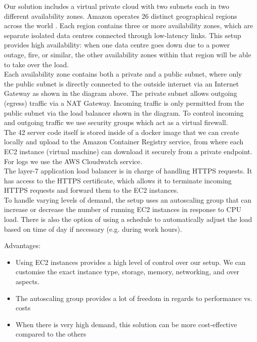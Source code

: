 Our solution includes a virtual private cloud with two subnets each in two different availability zones. Amazon operates 26 distinct geographical regions across the world \cite{amazon-2022D}. Each region contains three or more availability zones, which are separate isolated data centres connected through low-latency links. This setup provides high availability: when one data centre goes down due to a power outage, fire, or similar, the other availability zones within that region will be able to take over the load.
\\[12pt]
Each availability zone contains both a private and a public subnet, where only the public subnet is directly connected to the outside internet via an Internet Gateway as shown in the diagram above. The private subnet allows outgoing (egress) traffic via a NAT Gateway. Incoming traffic is only permitted from the public subnet via the load balancer shown in the diagram. To control incoming and outgoing traffic we use security groups which act as a virtual firewall.
\\[12pt]
The 42 server code itself is stored inside of a docker image that we can create locally and upload to the Amazon Container Registry service, from where each EC2 instance (virtual machine) can download it securely from a private endpoint. For logs we use the AWS Cloudwatch service.
\\[12pt]
The layer-7 application load balancer is in charge of handling HTTPS requests. It has access to the HTTPS certificate, which allows it to terminate incoming HTTPS requests and forward them to the EC2 instances.
\\[12pt]
To handle varying levels of demand, the setup uses an autoscaling group that can increase or decrease the number of running EC2 instances in response to CPU load. There is also the option of using a schedule to automatically adjust the load based on time of day if necessary (e.g. during work hours).

Advantages:
\begin{itemize}
\item Using EC2 instances provides a high level of control over our setup. We can customise the exact instance type, storage, memory, networking, and over aspects.
\item The autoscaling group provides a lot of freedom in regards to performance vs. costs
\item When there is very high demand, this solution can be more cost-effective compared to the others
\end{itemize}

